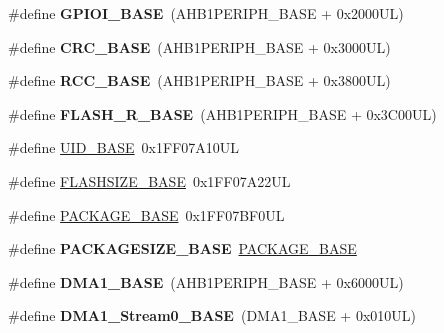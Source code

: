 \begin{DoxyCompactItemize}
\#define {\bfseries G\+P\+I\+O\+I\+\_\+\+B\+A\+SE}~(A\+H\+B1\+P\+E\+R\+I\+P\+H\+\_\+\+B\+A\+SE + 0x2000\+U\+L)
\item 
\mbox{\label{group___peripheral__memory__map_ga656a447589e785594cbf2f45c835ad7e}} 
\#define {\bfseries C\+R\+C\+\_\+\+B\+A\+SE}~(A\+H\+B1\+P\+E\+R\+I\+P\+H\+\_\+\+B\+A\+SE + 0x3000\+U\+L)
\item 
\mbox{\label{group___peripheral__memory__map_ga0e681b03f364532055d88f63fec0d99d}} 
\#define {\bfseries R\+C\+C\+\_\+\+B\+A\+SE}~(A\+H\+B1\+P\+E\+R\+I\+P\+H\+\_\+\+B\+A\+SE + 0x3800\+U\+L)
\item 
\mbox{\label{group___peripheral__memory__map_ga8e21f4845015730c5731763169ec0e9b}} 
\#define {\bfseries F\+L\+A\+S\+H\+\_\+\+R\+\_\+\+B\+A\+SE}~(A\+H\+B1\+P\+E\+R\+I\+P\+H\+\_\+\+B\+A\+SE + 0x3\+C00\+U\+L)
\item 
\#define \mbox{\hyperlink{group___peripheral__memory__map_ga664eda42b83c919b153b07b23348be67}{U\+I\+D\+\_\+\+B\+A\+SE}}~0x1\+F\+F07\+A10\+UL
\item 
\#define \mbox{\hyperlink{group___peripheral__memory__map_ga776d985f2d4d40b588ef6ca9d573af78}{F\+L\+A\+S\+H\+S\+I\+Z\+E\+\_\+\+B\+A\+SE}}~0x1\+F\+F07\+A22\+UL
\item 
\#define \mbox{\hyperlink{group___peripheral__memory__map_ga88fc8a2912bd1ac72c6eddb456f0b096}{P\+A\+C\+K\+A\+G\+E\+\_\+\+B\+A\+SE}}~0x1\+F\+F07\+B\+F0\+UL
\item 
\mbox{\label{group___peripheral__memory__map_ga82ee4266c05a8b5a8bf1e8e46b383c44}} 
\#define {\bfseries P\+A\+C\+K\+A\+G\+E\+S\+I\+Z\+E\+\_\+\+B\+A\+SE}~\mbox{\hyperlink{group___peripheral__memory__map_ga88fc8a2912bd1ac72c6eddb456f0b096}{P\+A\+C\+K\+A\+G\+E\+\_\+\+B\+A\+SE}}
\item 
\mbox{\label{group___peripheral__memory__map_gab2d8a917a0e4ea99a22ac6ebf279bc72}} 
\#define {\bfseries D\+M\+A1\+\_\+\+B\+A\+SE}~(A\+H\+B1\+P\+E\+R\+I\+P\+H\+\_\+\+B\+A\+SE + 0x6000\+U\+L)
\item 
\mbox{\label{group___peripheral__memory__map_ga0d3c52aa35dcc68f78b704dfde57ba95}} 
\#define {\bfseries D\+M\+A1\+\_\+\+Stream0\+\_\+\+B\+A\+SE}~(D\+M\+A1\+\_\+\+B\+A\+SE + 0x010\+U\+L)

\end{DoxyCompactItemize}
